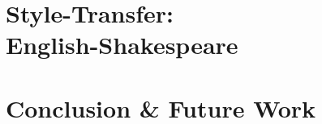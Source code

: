\documentclass[twoside,twocolumn]{article}
\begin{document}
\section{Style-Transfer:\\English-Shakespeare}
\label{sec:style-transfer}
\section{Conclusion \& Future Work}
\label{sec:conclusion}







\clearpage
\appendix
\onecolumn
\end{document}

